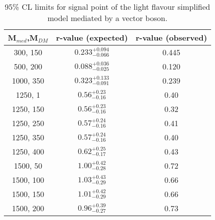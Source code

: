 \begin{table}[h!]
    \caption{%
    95\% CL limits for signal point of the light flavour simplified model 
    mediated by a vector boson. }
    \label{tab:DMV_limits}
    \centering
    \begin{tabular}{ ccc }
        \hline\hline
        M$_{med}$,M$_{DM}$ & r-value (expected) & r-value (observed) \\ 
        \hline
        300, 150  & $0.233_{-0.066}^{+0.094}$ & 0.445 \\
        500, 200  & $0.088_{-0.025}^{+0.036}$ & 0.120 \\
        1000, 350 & $0.323_{-0.091}^{+0.133}$ & 0.239 \\
        1250, 1   & $0.56_{-0.16}^{+0.23}$    & 0.40  \\
        1250, 150 & $0.56_{-0.16}^{+0.23}$    & 0.32  \\
        1250, 250 & $0.57_{-0.16}^{+0.24}$    & 0.41  \\
        1250, 350 & $0.57_{-0.16}^{+0.24}$    & 0.40  \\
        1250, 400 & $0.62_{-0.17}^{+0.25}$    & 0.43  \\
        1500, 50  & $1.00_{-0.28}^{+0.42}$    & 0.72  \\
        1500, 100 & $1.03_{-0.29}^{+0.43}$    & 0.66  \\
        1500, 150 & $1.01_{-0.29}^{+0.42}$    & 0.66  \\
        1500, 200 & $0.96_{-0.27}^{+0.39}$    & 0.73  \\
        \hline\hline
    \end{tabular}
\end{table}

